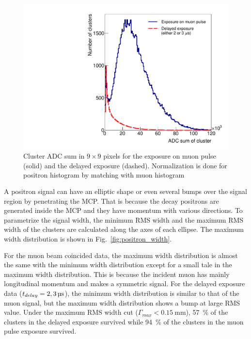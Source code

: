 \documentclass[preprint,3p,twocolumn]{elsarticle}
\begin{document}
\begin{figure}[tbp]
	\centering
	\includegraphics[width=\columnwidth]{figure/Integ_legend_v2.pdf}
	\caption{Cluster ADC sum in $9\times9$ pixels for the exposure on muon pulse (solid) and the delayed exposure (dashed).
		Normalization is done for positron histogram by matching with muon histogram}
	\vspace{-0.2cm}
	\label{fig:BPM_int}
\end{figure}

A positron signal can have an elliptic shape or even several bumps over the signal region by penetrating the MCP. That is because the decay positrons are generated inside the MCP and they have momentum with various directions. 
To parametrize the signal width, the minimum RMS width and the maximum RMS width of the clusters are calculated along the axes of each ellipse. The maximum width distribution is shown in Fig.~\ref{fig:positron_width}.

For the muon beam coincided data, the maximum width distribution is almost the same with the minimum width distribution except for a small tale in the maximum width distribution. This is because the incident muon has mainly longitudinal momentum and makes a symmetric signal.
For the delayed exposure data
($t_{delay} = \SIlist[list-pair-separator = {, }, list-units = single]{2; 3}{\micro\s}$),
the minimum width distribution is similar to that of the muon signal, but the maximum width distribution shows a bump at large RMS value. Under the maximum RMS width cut
($\Gamma_{max} < \SI{0.15}{\mm}$),
\SI{57}{\percent} of the clusters in the delayed exposure survived while \SI{94}{\percent} of the clusters in the muon pulse exposure survived.
\end{document}
